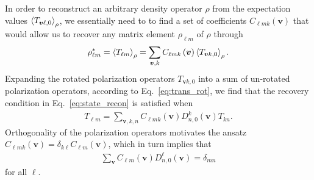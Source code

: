 \documentclass[notitlepage,twocolumn]{revtex4-2}
\newcommand{\p}[1]{\left(#1\right)} %
\newcommand{\bk}{\Braket} %
\renewcommand{\v}{\bm} %
\begin{document}
In order to reconstruct an arbitrary density operator $\rho$ from the expectation values $\bk{T_{\v v\ell,0}}_\rho$, we essentially need to to find a set of coefficients $C_{\ell mk}\p{\v v}$ that would allow us to recover any matrix element $\rho_{\ell m}$ of $\rho$ through
\begin{align}
  \rho_{\ell m}^* = \bk{T_{\ell m}}_\rho
  = \sum_{\v v,k} C_{\ell mk}\p{\v v} \bk{T_{\v vk,0}}_\rho.
  \label{eq:state_recon}
\end{align}
Expanding the rotated polarization operators $T_{\v vk,0}$ into a sum of un-rotated polarization operators, according to Eq.~\eqref{eq:trans_rot}, we find that the recovery condition in Eq.~\eqref{eq:state_recon} is satisfied when
\begin{align}
  T_{\ell m}
  = \sum_{\v v,k,n} C_{\ell mk}\p{\v v}
  D^k_{n,0}\p{\v v} T_{kn}.
\end{align}
Orthogonality of the polarization operators motivates the ansatz $C_{\ell mk}\p{\v v}=\delta_{k\ell}C_{\ell m}\p{\v v}$, which in turn implies that
\begin{align}
  \sum_{\v v} C_{\ell m}\p{\v v} D^\ell_{n,0}\p{\v v} = \delta_{mn}
  \label{eq:tomo_recovery}
\end{align}
for all $\ell$.
\end{document}
